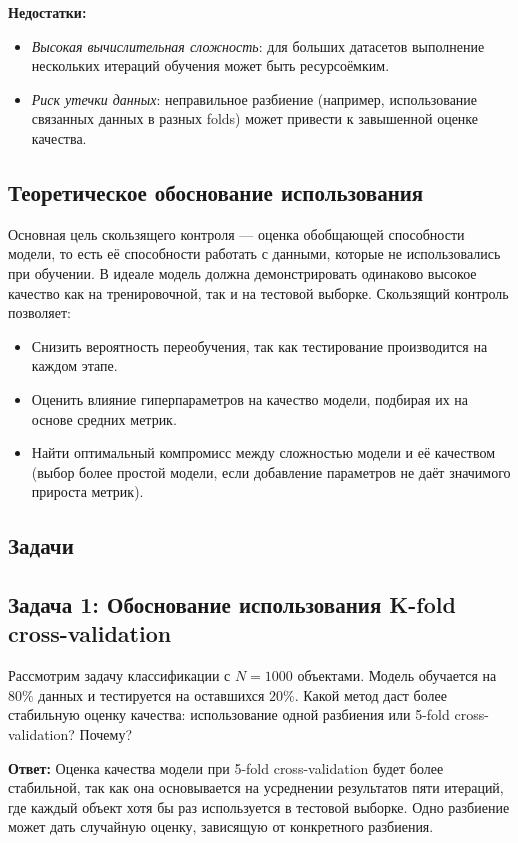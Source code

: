 \textbf{Недостатки:}
\begin{itemize}
    \item \textit{Высокая вычислительная сложность}: для больших датасетов выполнение нескольких итераций обучения может быть ресурсоёмким.
    \item \textit{Риск утечки данных}: неправильное разбиение (например, использование связанных данных в разных folds) может привести к завышенной оценке качества.
\end{itemize}

\subsection*{Теоретическое обоснование использования}
Основная цель скользящего контроля — оценка обобщающей способности модели, то есть её способности работать с данными, которые не использовались при обучении. В идеале модель должна демонстрировать одинаково высокое качество как на тренировочной, так и на тестовой выборке. Скользящий контроль позволяет:
\begin{itemize}
    \item Снизить вероятность переобучения, так как тестирование производится на каждом этапе.
    \item Оценить влияние гиперпараметров на качество модели, подбирая их на основе средних метрик.
    \item Найти оптимальный компромисс между сложностью модели и её качеством (выбор более простой модели, если добавление параметров не даёт значимого прироста метрик).
\end{itemize}

\subsection*{Задачи}

\subsection*{Задача 1: Обоснование использования K-fold cross-validation}
Рассмотрим задачу классификации с $N=1000$ объектами. Модель обучается на $80\%$ данных и тестируется на оставшихся $20\%$. Какой метод даст более стабильную оценку качества: использование одной разбиения или 5-fold cross-validation? Почему?

\textbf{Ответ:}
Оценка качества модели при 5-fold cross-validation будет более стабильной, так как она основывается на усреднении результатов пяти итераций, где каждый объект хотя бы раз используется в тестовой выборке. Одно разбиение может дать случайную оценку, зависящую от конкретного разбиения.

